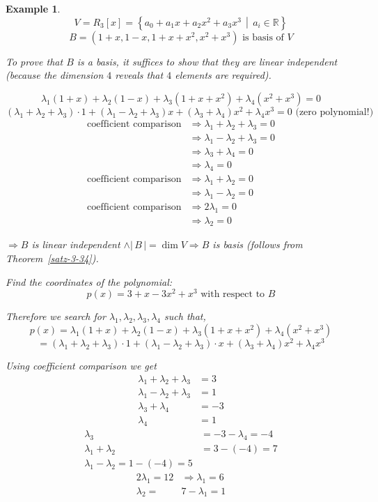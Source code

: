 \documentclass[a4paper,landscape,twocolumn]{article}
\newcommand\setdef[2]{\left\{#1\,\middle|\,#2\right\}}
\newcommand\card[1]{\left|\,#1\,\right|}
\newtheorem{ex}{Example}
\begin{document}
\begin{ex}
  \[ V = R_3[x] = \setdef{a_0 + a_1 x + a_2 x^2 + a_3 x^3}{a_i \in \mathbb R} \]
  \[ B = (1 + x, 1 - x, 1 + x + x^2, x^2 + x^3) \text{ is basis of } V \]

  To prove that $B$ is a basis, it suffices to show that they are linear independent (because the dimension $4$ reveals that $4$ elements are required).

  \[ \lambda_1 (1+x) + \lambda_2 (1-x) + \lambda_3(1+x+x^2) + \lambda_4(x^2+x^3) = 0 \]
  \[ (\lambda_1 + \lambda_2 + \lambda_3) \cdot 1 + (\lambda_1 - \lambda_2 + \lambda_3) x + (\lambda_3 + \lambda_4) x^2 + \lambda_4 x^3 = 0 \text{ (zero polynomial!)} \]
  \begin{align*}
    \text{coefficient comparison} &\Rightarrow \lambda_1 + \lambda_2 + \lambda_3 = 0 \\
      &\Rightarrow \lambda_1 - \lambda_2 + \lambda_3 = 0 \\
      &\Rightarrow \lambda_3 + \lambda_4 = 0 \\
      &\Rightarrow \lambda_4 = 0 \\
    \text{coefficient comparison} &\Rightarrow \lambda_1 + \lambda_2 = 0 \\
      &\Rightarrow \lambda_1 - \lambda_2 = 0 \\
    \text{coefficient comparison} &\Rightarrow 2 \lambda_1 = 0 \\
      &\Rightarrow \lambda_2 = 0
  \end{align*}

  $\Rightarrow B$ is linear independent $\land \card{B} = \dim{V} \Rightarrow B$ is basis (follows from Theorem~\ref{satz-3-34}).

  Find the coordinates of the polynomial:
  \[ p(x) = 3 + x - 3x^2 + x^3 \text{ with respect to } B \]

  Therefore we search for $\lambda_1, \lambda_2, \lambda_3, \lambda_4$ such that,
  \[ p(x) = \lambda_1 (1 + x) + \lambda_2 (1 - x) + \lambda_3 (1 + x + x^2) + \lambda_4 (x^2 + x^3) \]
  \[ = (\lambda_1 + \lambda_2 + \lambda_3) \cdot 1 + (\lambda_1 - \lambda_2 + \lambda_3) \cdot x + (\lambda_3 + \lambda_4) x^2 + \lambda_4 x^3 \]

  Using coefficient comparison we get
  \begin{align*}
    \lambda_1 + \lambda_2 + \lambda_3 &= 3 \\
    \lambda_1 - \lambda_2 + \lambda_3 &= 1 \\
                \lambda_3 + \lambda_4 &= -3 \\
                            \lambda_4 &= 1
  \end{align*}
  \begin{align*}
    \lambda_3 &= -3 - \lambda_4 = -4 \\
    \lambda_1 + \lambda_2 &= 3 - (-4) = 7 \\
    \lambda_1 - \lambda_2 = 1 - (-4) = 5
  \end{align*}
  \begin{align*}
    2\lambda_1 = 12 &\Rightarrow \lambda_1 = 6 \\
    \lambda_2 = &7 - \lambda_1 = 1
  \end{align*}


\end{ex}
\end{document}
